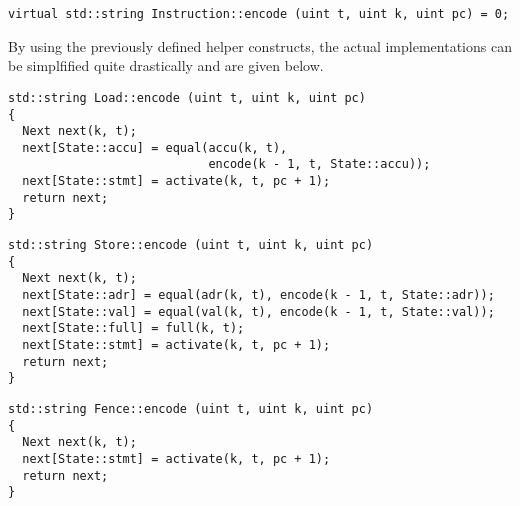 
\begin{lstlisting}[style=c++]
virtual std::string Instruction::encode (uint t, uint k, uint pc) = 0;
\end{lstlisting}


\noindent
By using the previously defined helper constructs, the actual implementations can be simplfified quite drastically and are given below. %

\newpage

\begin{lstlisting}[style=c++, style=encode]
std::string Load::encode (uint t, uint k, uint pc)
{
  Next next(k, t);
  next[State::accu] = equal(accu(k, t),
                            encode(k - 1, t, State::accu));
  next[State::stmt] = activate(k, t, pc + 1);
  return next;
}
\end{lstlisting}


\begin{lstlisting}[style=c++, style=encode]
std::string Store::encode (uint t, uint k, uint pc)
{
  Next next(k, t);
  next[State::adr] = equal(adr(k, t), encode(k - 1, t, State::adr));
  next[State::val] = equal(val(k, t), encode(k - 1, t, State::val));
  next[State::full] = full(k, t);
  next[State::stmt] = activate(k, t, pc + 1);
  return next;
}
\end{lstlisting}


\begin{lstlisting}[style=c++, style=encode]
std::string Fence::encode (uint t, uint k, uint pc)
{
  Next next(k, t);
  next[State::stmt] = activate(k, t, pc + 1);
  return next;
}
\end{lstlisting}

